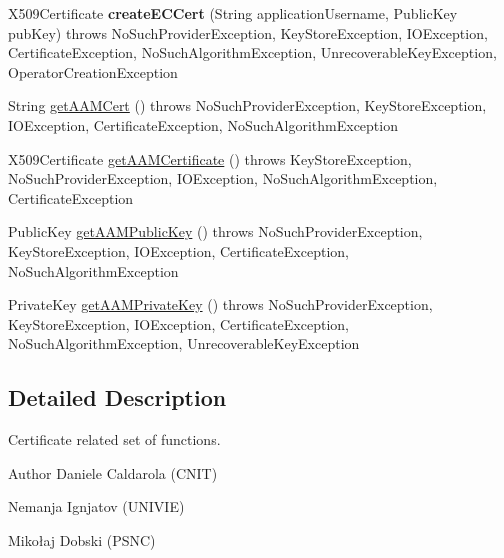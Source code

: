 \begin{DoxyCompactItemize}
\item 
X509\+Certificate {\bfseries create\+E\+C\+Cert} (String application\+Username, Public\+Key pub\+Key)  throws No\+Such\+Provider\+Exception,             Key\+Store\+Exception,             I\+O\+Exception,             Certificate\+Exception,             No\+Such\+Algorithm\+Exception,             Unrecoverable\+Key\+Exception,             Operator\+Creation\+Exception \hypertarget{classeu_1_1h2020_1_1symbiote_1_1security_1_1commons_1_1RegistrationManager_a0314ce25d908c19e4ee74aa7a16e774f}{}\label{classeu_1_1h2020_1_1symbiote_1_1security_1_1commons_1_1RegistrationManager_a0314ce25d908c19e4ee74aa7a16e774f}

\item 
String \hyperlink{classeu_1_1h2020_1_1symbiote_1_1security_1_1commons_1_1RegistrationManager_ad0d8b5b76a7a4e6af7cc05da24ceb372}{get\+A\+A\+M\+Cert} ()  throws No\+Such\+Provider\+Exception, Key\+Store\+Exception, I\+O\+Exception,             Certificate\+Exception, No\+Such\+Algorithm\+Exception 
\item 
X509\+Certificate \hyperlink{classeu_1_1h2020_1_1symbiote_1_1security_1_1commons_1_1RegistrationManager_a6da67f355303984fd200d15e4f0f65e9}{get\+A\+A\+M\+Certificate} ()  throws Key\+Store\+Exception, No\+Such\+Provider\+Exception, I\+O\+Exception,             No\+Such\+Algorithm\+Exception, Certificate\+Exception 
\item 
Public\+Key \hyperlink{classeu_1_1h2020_1_1symbiote_1_1security_1_1commons_1_1RegistrationManager_a0a21033808e632706ce98665013df616}{get\+A\+A\+M\+Public\+Key} ()  throws No\+Such\+Provider\+Exception, Key\+Store\+Exception, I\+O\+Exception,             Certificate\+Exception, No\+Such\+Algorithm\+Exception 
\item 
Private\+Key \hyperlink{classeu_1_1h2020_1_1symbiote_1_1security_1_1commons_1_1RegistrationManager_a66fb3d06fce378aa7c1a1eb37528fcea}{get\+A\+A\+M\+Private\+Key} ()  throws No\+Such\+Provider\+Exception, Key\+Store\+Exception, I\+O\+Exception,             Certificate\+Exception, No\+Such\+Algorithm\+Exception, Unrecoverable\+Key\+Exception 
\end{DoxyCompactItemize}


\subsection{Detailed Description}
Certificate related set of functions.

\begin{DoxyAuthor}{Author}
Daniele Caldarola (C\+N\+IT) 

Nemanja Ignjatov (U\+N\+I\+V\+IE) 

Mikołaj Dobski (P\+S\+NC) 
\end{DoxyAuthor}


